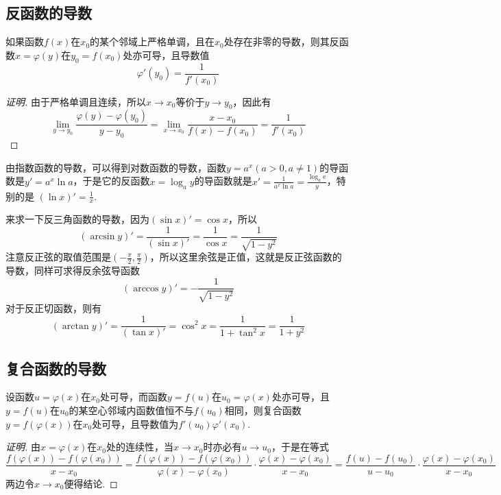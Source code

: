 \subsection{反函数的导数}
\label{sec:derivative-of-revert-function}

\begin{theorem}
  如果函数$f(x)$在$x_0$的某个邻域上严格单调，且在$x_0$处存在非零的导数，则其反函数$x=\varphi(y)$在$y_0=f(x_0)$处亦可导，且导数值
  \[ \varphi '(y_0) = \frac{1}{f'(x_0)} \]
\end{theorem}

\begin{proof}[证明]
  由于严格单调且连续，所以$x \to x_0$等价于$y \to y_0$，因此有
  \[ \lim_{y \to y_0} \frac{\varphi(y)-\varphi(y_0)}{y-y_0} = \lim_{x \to x_0} \frac{x-x_0}{f(x)-f(x_0)} = \frac{1}{f'(x_0)} \]
\end{proof}

\begin{example}
  由指数函数的导数，可以得到对数函数的导数，函数$y=a^x(a>0, a \neq 1)$的导函数是$y'=a^x \ln{a}$，于是它的反函数$x=\log_a y$的导函数就是$x'=\frac{1}{a^x \ln{a}}=\frac{\log_a \mathrm{e}}{y}$，特别的是 $(\ln{x})'=\frac{1}{x}$.
\end{example}

\begin{example}
  来求一下反三角函数的导数，因为$(\sin{x})'=\cos{x}$，所以
  \[ (\arcsin{y})'=\frac{1}{(\sin{x})'} = \frac{1}{\cos{x}} = \frac{1}{\sqrt{1-y^2}} \]
  注意反正弦的取值范围是$(-\frac{\pi}{2},\frac{\pi}{2})$，所以这里余弦是正值，这就是反正弦函数的导数，同样可求得反余弦导函数
  \[ (\arccos{y})' = - \frac{1}{\sqrt{1-y^2}} \]
  对于反正切函数，则有
  \[ (\arctan{y})' = \frac{1}{(\tan{x})'} = \cos^2{x} = \frac{1}{1+\tan^2{x}} = \frac{1}{1+y^2} \]
\end{example}

\subsection{复合函数的导数}
\label{sec:derivative-of-embed-function}

\begin{theorem}
  设函数$u=\varphi(x)$在$x_0$处可导，而函数$y=f(u)$在$u_0=\varphi(x)$处亦可导，且$y=f(u)$在$u_0$的某空心邻域内函数值恒不与$f(u_0)$相同，则复合函数$y=f(\varphi(x))$在$x_0$处可导，且导数值为$f'(u_0)\varphi '(x_0)$.
\end{theorem}

\begin{proof}[证明]
  由$x=\varphi(x)$在$x_0$处的连续性，当$x \to x_0$时亦必有$u \to u_0$，于是在等式
  \[ \frac{f(\varphi(x))-f(\varphi(x_0))}{x-x_0} = \frac{f(\varphi(x))-f(\varphi(x_0))}{\varphi(x)-\varphi(x_0)} \cdot \frac{\varphi(x)-\varphi(x_0)}{x-x_0} = \frac{f(u)-f(u_0)}{u-u_0} \cdot \frac{\varphi(x)-\varphi(x_0)}{x-x_0} \]
  两边令$x \to x_0$便得结论.
\end{proof}

